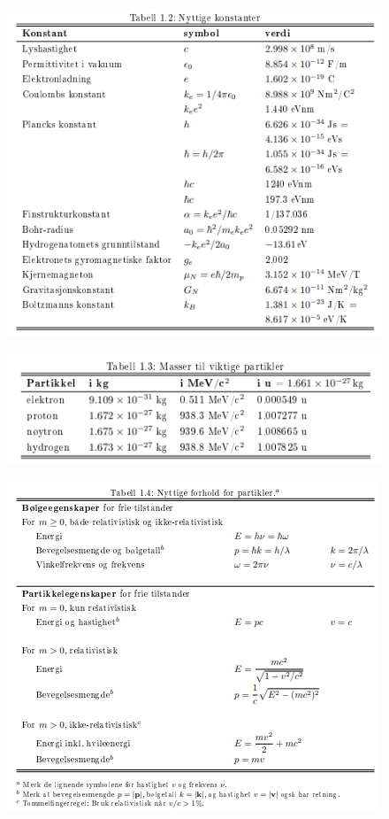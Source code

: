 \begin{figure}[ht!]
  \centering
  \includegraphics[scale = 1]{Figures/Constants table.png}
  \caption{}
  \label{fig: Constants table}
\end{figure}

\begin{figure}[ht!]
  \centering
  \includegraphics[scale = 1]{Figures/Masser til viktige partikler.png}
  \caption{}
  \label{fig: Masser til viktige partikler}
\end{figure}

\begin{figure}[ht!]
  \centering
  \includegraphics[scale = 1]{Figures/Nyttige forhold for partikler.png}
  \caption{}
  \label{fig: Nyttige forhold for partikler}
\end{figure}

